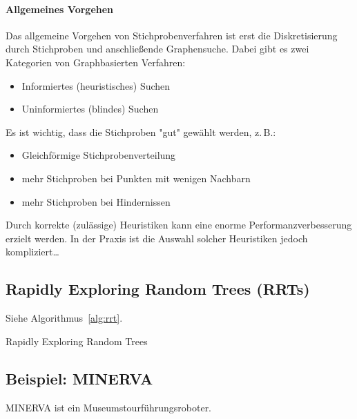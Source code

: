 			\paragraph{Allgemeines Vorgehen}
				Das allgemeine Vorgehen von Stichprobenverfahren ist erst die Diskretisierung durch Stichproben und anschließende Graphensuche. Dabei gibt es zwei Kategorien von Graphbasierten Verfahren:
				\begin{itemize}
					\item Informiertes (heuristisches) Suchen
					\item Uninformiertes (blindes) Suchen
				\end{itemize}
				Es ist wichtig, dass die Stichproben "gut" gewählt werden, z.\,B.:
				\begin{itemize}
					\item Gleichförmige Stichprobenverteilung
					\item mehr Stichproben bei Punkten mit wenigen Nachbarn
					\item mehr Stichproben bei Hindernissen
				\end{itemize}

				Durch korrekte (zulässige) Heuristiken kann eine enorme Performanzverbesserung erzielt werden. In der Praxis ist die Auswahl solcher Heuristiken jedoch kompliziert\dots

		\subsection{Rapidly Exploring Random Trees (RRTs)}
			Siehe Algorithmus~\ref{alg:rrt}.

			\begin{algorithm}
				\caption{Rapidly Exploring Random Trees}
				\label{alg:rrt}
			\end{algorithm}

		\subsection{Beispiel: MINERVA}
			MINERVA ist ein Museumstourführungsroboter.

